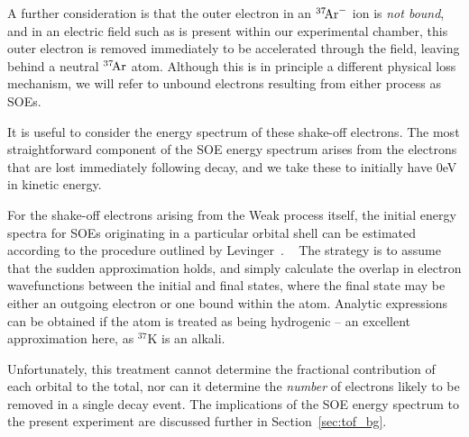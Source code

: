 A further consideration is that the outer electron in an $^{37}\textrm{\!Ar}^{-}$ ion is \emph{not bound},~ and in an electric field such as is present within our experimental chamber, this outer electron is removed immediately to be accelerated through the field, leaving behind a neutral $^{37}\textrm{\!Ar}$ atom.  Although this is in principle a different physical loss mechanism, we will refer to unbound electrons resulting from either process as SOEs.  

It is useful to consider the energy spectrum of these shake-off electrons.  The most straightforward component of the SOE energy spectrum arises from the electrons that are lost immediately following decay, and we take these to initially have 0eV in kinetic energy.  

For the shake-off electrons arising from the Weak process itself, the initial energy spectra for SOEs originating in a particular orbital shell can be estimated according to the procedure outlined by Levinger~\cite{Levinger}.
~  \noindent
The strategy is to assume that the sudden approximation holds, and simply calculate the overlap in electron wavefunctions between the initial and final states, where the final state may be either an outgoing electron or one bound within the atom.  Analytic expressions can be obtained if the atom is treated as being hydrogenic -- an excellent approximation here, as $^{37}\textrm{K}$ is an alkali.  

Unfortunately, this treatment cannot determine the fractional contribution of each orbital to the total, nor can it determine the \emph{number} of electrons likely to be removed in a single decay event.  The implications of the SOE energy spectrum to the present experiment are discussed further in Section~\ref{sec:tof_bg}.



